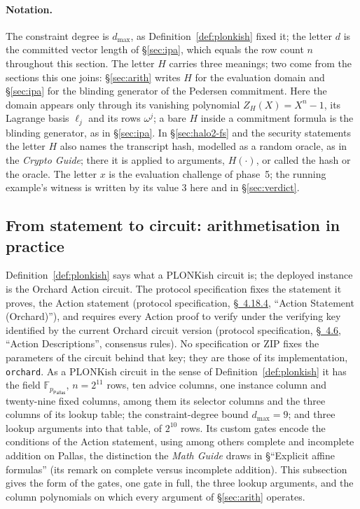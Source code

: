 \documentclass[11pt,a4paper]{article}
\theoremstyle{definition}
\newcommand{\F}{\mathbb{F}}
\newcommand{\Pallas}{\ensuremath{\mathsf{Pallas}}}
\newcommand{\ZH}{Z_H}
\begin{document}
\paragraph{Notation.}
The constraint degree is $d_{\max}$, as Definition~\ref{def:plonkish} fixed
it; the letter $d$ is the committed vector length of \S\ref{sec:ipa}, which
equals the row count $n$ throughout this section. The letter $H$ carries
three meanings; two come from the sections this one joins:
\S\ref{sec:arith} writes $H$ for the evaluation domain and \S\ref{sec:ipa}
for the blinding generator of the Pedersen commitment. Here the domain
appears only through its vanishing polynomial $\ZH(X) = X^n - 1$, its
Lagrange basis $\ell_j$ and its rows $\omega^j$; a bare $H$ inside a
commitment formula is the blinding generator, as in \S\ref{sec:ipa}.
In \S\ref{sec:halo2-fs} and the security statements the letter $H$ also
names the transcript hash, modelled as a random oracle, as in the
\emph{Crypto Guide}; there it is applied to arguments, $H(\cdot)$, or
called the hash or the oracle. The letter $x$ is the evaluation challenge
of phase~5; the running example's witness is written by its value $3$
here and in \S\ref{sec:verdict}.

\subsection{From statement to circuit: arithmetisation in practice}
\label{sec:halo2-practice}

Definition~\ref{def:plonkish} says what a PLONKish circuit is; the deployed
instance is the Orchard Action circuit. The protocol specification fixes the
statement it proves, the Action statement (protocol specification,
\href{https://zips.z.cash/protocol/protocol.pdf\#actionstatement}{\S~4.18.4},
``Action Statement (Orchard)''), and requires every Action proof to verify under
the verifying key identified by the current Orchard circuit version (protocol
specification,
\href{https://zips.z.cash/protocol/protocol.pdf\#actiondesc}{\S~4.6}, ``Action
Descriptions'', consensus rules). No specification or ZIP fixes
the parameters of the circuit behind that key; they are those of its
implementation, \texttt{orchard}. As a PLONKish circuit in the sense of
Definition~\ref{def:plonkish} it has the field $\F_{p_{\Pallas}}$,
$n = 2^{11}$ rows, ten advice columns, one instance column and
twenty-nine fixed columns, among them its selector columns and the three
columns of its lookup table; the constraint-degree bound $d_{\max} = 9$;
and three lookup arguments into that table, of $2^{10}$ rows. Its custom
gates encode the conditions of the Action statement, using among others
complete and incomplete addition on Pallas, the distinction the
\emph{Math Guide} draws in \S``Explicit affine formulas'' (its remark on
complete versus incomplete addition). This subsection gives the form of
the gates, one gate in full, the three lookup arguments, and the column
polynomials on which every argument of \S\ref{sec:arith} operates.
\end{document}
